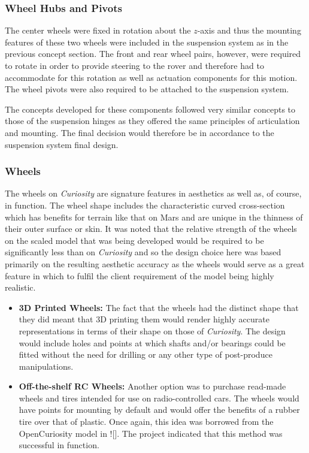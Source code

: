     \subsubsection{Wheel Hubs and Pivots}
      The center wheels were fixed in rotation about the $z$-axis and thus the mounting features of these two wheels were included in the suspension system as in the previous concept section. The front and rear wheel pairs, however, were required to rotate in order to provide steering to the rover and therefore had to accommodate for this rotation as well as actuation components for this motion. The wheel pivots were also required to be attached to the suspension system.
      
      The concepts developed for these components followed very similar concepts to those of the suspension hinges as they offered the same principles of articulation and mounting. The final decision would therefore be in accordance to the suspension system final design.
      
    \subsubsection{Wheels}
      The wheels on \textit{Curiosity} are signature features in aesthetics as well as, of course, in function. The wheel shape includes the characteristic curved cross-section which has benefits for terrain like that on Mars and are unique in the thinness of their outer surface or skin. It was noted that the relative strength of the wheels on the scaled model that was being developed would be required to be significantly less than on \textit{Curiosity} and so the design choice here was based primarily on the resulting aesthetic accuracy as the wheels would serve as a great feature in which to fulfil the client requirement of the model being highly realistic.
      
      \begin{itemize}
        \item \textbf{3D Printed Wheels:} The fact that the wheels had the distinct shape that they did meant that 3D printing them would render highly accurate representations in terms of their shape on those of \textit{Curiosity}. The design would include holes and points at which shafts and/or bearings could be fitted without the need for drilling or any other type of post-produce manipulations.
        
        \item \textbf{Off-the-shelf RC Wheels:} Another option was to purchase read-made wheels and tires intended for use on radio-controlled cars. The wheels would have points for mounting by default and would offer the benefits of a rubber tire over that of plastic. Once again, this idea was borrowed from the OpenCuriosity model in ![]. The project indicated that this method was successful in function.
      \end{itemize}
      
